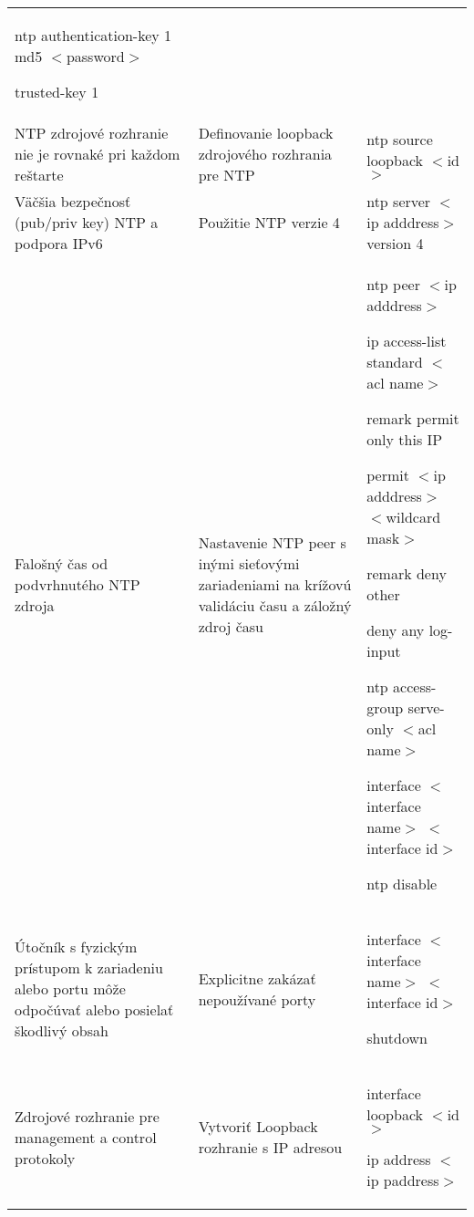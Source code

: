 \begin{longtable}[!htbp]{|L{10em}L{10em}>{\selectfont}L{34em}|}
	ntp authentication-key 1 md5 $<$password$>$
	
	trusted-key 1\\
	
	
	
	
	NTP zdrojové rozhranie nie je rovnaké pri každom reštarte	& Definovanie loopback zdrojového rozhrania pre NTP	&ntp source loopback $<$id$>$\\
	
	
	
	
	Väčšia bezpečnosť (pub/priv key) NTP a podpora IPv6	&Použitie NTP verzie 4	&ntp server $<$ip adddress$>$ version 4\\
	
	
	
	Falošný čas od podvrhnutého NTP zdroja	&Nastavenie NTP peer s inými sieťovými zariadeniami na krížovú validáciu času a záložný zdroj času	&ntp peer $<$ip adddress$>$
	
	ip access-list standard $<$acl name$>$
	
	\hspace{0.5em}remark permit only this IP 
	
	\hspace{0.5em}permit $<$ip adddress$>$ $<$wildcard mask$>$
	
	\hspace{0.5em}remark deny other 
	
	\hspace{0.5em}deny any log-input
	
	ntp access-group serve-only $<$acl name$>$
	
	interface $<$interface name$>$ $<$interface id$>$
	
	\hspace{0.5em}ntp disable\\
	
	
	
	
	 Útočník s fyzickým prístupom k zariadeniu alebo portu môže odpočúvať alebo posielať škodlivý obsah	&Explicitne zakázať nepoužívané porty	&interface $<$interface name$>$ $<$interface id$>$
	
	\hspace{0.5em}shutdown\\
	
	
	
	
	Zdrojové rozhranie pre management a control protokoly	&Vytvoriť Loopback rozhranie s IP adresou	&interface loopback $<$id$>$
	
	\hspace{0.5em}ip address $<$ip paddress$>$\\
	

\end{longtable}
